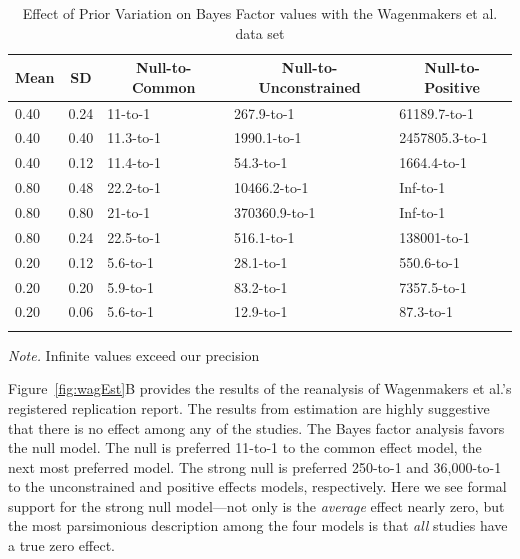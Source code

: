 \documentclass[english,man]{apa6}
\theoremstyle{definition}
\theoremstyle{definition}
\theoremstyle{definition}
\theoremstyle{remark}
\begin{document}
\begin{table}[tbp]
\begin{center}
\begin{threeparttable}
\caption{\label{tab:sens}Effect of Prior Variation on Bayes Factor values with the Wagenmakers et al. data set}
\begin{tabular}{lllll}
\toprule
Mean & \multicolumn{1}{c}{SD} & \multicolumn{1}{c}{Null-to-Common} & \multicolumn{1}{c}{Null-to-Unconstrained} & \multicolumn{1}{c}{Null-to-Positive}\\
\midrule
0.40 & 0.24 & 11-to-1 & 267.9-to-1 & 61189.7-to-1\\
0.40 & 0.40 & 11.3-to-1 & 1990.1-to-1 & 2457805.3-to-1\\
0.40 & 0.12 & 11.4-to-1 & 54.3-to-1 & 1664.4-to-1\\
0.80 & 0.48 & 22.2-to-1 & 10466.2-to-1 & Inf-to-1\\
0.80 & 0.80 & 21-to-1 & 370360.9-to-1 & Inf-to-1\\
0.80 & 0.24 & 22.5-to-1 & 516.1-to-1 & 138001-to-1\\
0.20 & 0.12 & 5.6-to-1 & 28.1-to-1 & 550.6-to-1\\
0.20 & 0.20 & 5.9-to-1 & 83.2-to-1 & 7357.5-to-1\\
0.20 & 0.06 & 5.6-to-1 & 12.9-to-1 & 87.3-to-1\\
\bottomrule
\addlinespace
\end{tabular}
\begin{tablenotes}[para]
\textit{Note.} Infinite values exceed our precision
\end{tablenotes}
\end{threeparttable}
\end{center}
\end{table}

Figure~\ref{fig:wagEst}B provides the results of the reanalysis of
Wagenmakers et al.'s registered replication report. The results from
estimation are highly suggestive that there is no effect among any of
the studies. The Bayes factor analysis favors the null model. The null
is preferred 11-to-1 to the common effect model, the next most preferred
model. The strong null is preferred 250-to-1 and 36,000-to-1 to the
unconstrained and positive effects models, respectively. Here we see
formal support for the strong null model---not only is the
\emph{average} effect nearly zero, but the most parsimonious description
among the four models is that \emph{all} studies have a true zero
effect.
\end{document}

